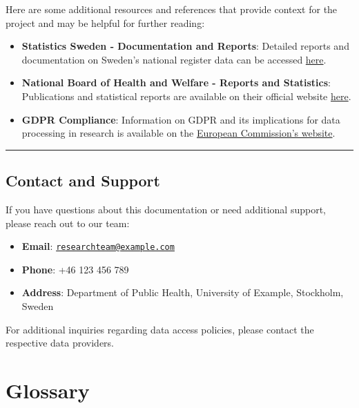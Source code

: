 \documentclass[
]{book}
\providecommand{\tightlist}{%
  \setlength{\itemsep}{0pt}\setlength{\parskip}{0pt}}
\begin{document}
Here are some additional resources and references that provide context for the project and may be helpful for further reading:

\begin{itemize}
\tightlist
\item
  \textbf{Statistics Sweden - Documentation and Reports}: Detailed reports and documentation on Sweden's national register data can be accessed \href{https://www.scb.se/en/documentation/}{here}.
\item
  \textbf{National Board of Health and Welfare - Reports and Statistics}: Publications and statistical reports are available on their official website \href{https://www.socialstyrelsen.se/statistics-and-data/}{here}.
\item
  \textbf{GDPR Compliance}: Information on GDPR and its implications for data processing in research is available on the \href{https://ec.europa.eu/info/law/law-topic/data-protection_en}{European Commission's website}.
\end{itemize}

\begin{center}\rule{0.5\linewidth}{0.5pt}\end{center}

\hypertarget{contact-and-support}{%
\section{Contact and Support}\label{contact-and-support}}

If you have questions about this documentation or need additional support, please reach out to our team:

\begin{itemize}
\tightlist
\item
  \textbf{Email}: \href{mailto:researchteam@example.com}{\nolinkurl{researchteam@example.com}}
\item
  \textbf{Phone}: +46 123 456 789
\item
  \textbf{Address}: Department of Public Health, University of Example, Stockholm, Sweden
\end{itemize}

For additional inquiries regarding data access policies, please contact the respective data providers.

\hypertarget{glossary}{%
\chapter{Glossary}\label{glossary}}
\end{document}
